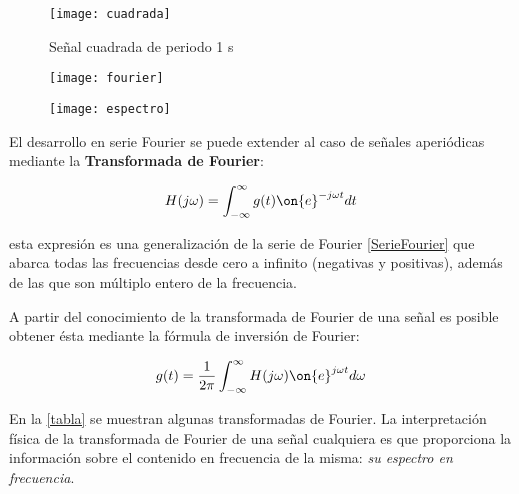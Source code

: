 

\ifEPUB %
	\begin{figure}[htbp]\centering
		\texttt{[image: cuadrada]}
		\caption{Señal cuadrada de periodo 1 s}
		\label{cuadrada}
		\bigskip
	\end{figure}
\fi

\begin{figure}[h]
\centering
\parbox[t]{0.475\textwidth}{\centering
	\texttt{[image: fourier]}
	\label{fig:fourier}
}
\hfill
\parbox[t]{0.475\textwidth}{\centering
	\texttt{[image: espectro]}
	\label{fig:espectro}
}
\end{figure}


El desarrollo en serie Fourier se puede extender al caso de señales aperiódicas mediante la
{\bf Transformada de Fourier}:

\begin{equation*}
	H(j\omega) = \int_{-\infty}^{\infty}g(t)\on{e}^{-j\omega t}dt
\end{equation*}

esta expresión es una generalización de la serie de Fourier \eqref{SerieFourier} que
abarca todas las frecuencias desde cero a infinito (negativas y positivas), además de las que
son múltiplo entero de la frecuencia.

A partir del conocimiento de la transformada de Fourier de una señal es posible obtener ésta
mediante la fórmula de inversión de Fourier:

\begin{equation*}
	g(t) = \dfrac{1}{2\pi}\int _{-\infty}^{\infty} H(j\omega)\on{e}^{j\omega t}d\omega
\end{equation*}

En la \autoref{tabla} se muestran algunas transformadas de Fourier. La interpretación física de la transformada de Fourier de una señal cualquiera es que
proporciona la información sobre el contenido en frecuencia de la misma: \textsl{su espectro en
frecuencia}.

